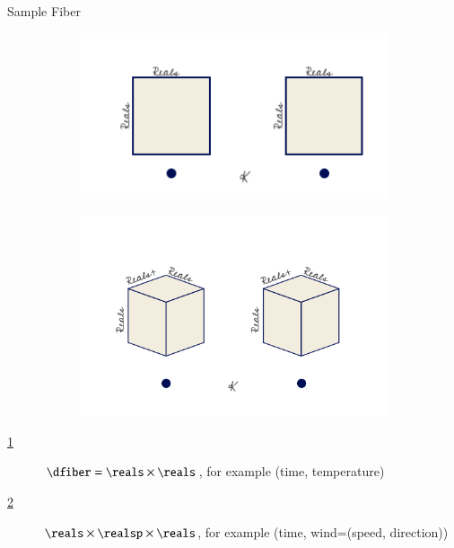 \documentclass[xcolor={dvipsnames}, handout]{beamer}
\begin{document}
\begin{frame}{Sample Fiber}
    \begin{figure}[H]
        \begin{subfigure}{.4\textwidth}
            \includegraphics[width=\textwidth]{figures/math/temp_1k.png}
            \caption{}
            \label{fig:fiber_example_plane}
        \end{subfigure}
        \begin{subfigure}{.4\textwidth}
            \includegraphics[width=\textwidth]{figures/math/temp_3f.png}
            \caption{}
            \label{fig:fiber_example_cube}
        \end{subfigure}
        \caption{}
        \label{fig:data_fiber_example}
    \end{figure}
    \begin{description}
        \item[\ref{fig:fiber_example_plane}]  $\dfiber=\reals\times\reals$, for example (time, temperature)
        \item[\ref{fig:fiber_example_cube}]  $\reals\times\realsp\times\reals$, for example  (time, wind=(speed, direction))
    \end{description}
\end{frame}
\end{document}
